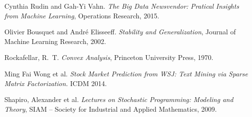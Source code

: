 \begin{thebibliography}{99}

  Cynthia Rudin and Gah-Yi Vahn. \textit{The Big Data Newsvendor: Pratical Insights from
    Machine Learning}, Operations Research, 2015.

  Olivier Bousquet and André Elisseeff. \textit{Stability and Generalization}, Journal of
  Machine Learning Research, 2002.

  Rockafellar, R.~T. \emph{Convex Analysis}, Princeton University Press, 1970.

 Ming Fai Wong et al. \emph{Stock Market Prediction from WSJ: Text Mining via
    Sparse Matrix Factorization.} ICDM 2014. 

Shapiro, Alexander et al. \emph{Lectures on Stochastic Programming:
    Modeling and Theory}, SIAM -- Society for Industrial and Applied Mathematics, 2009.

\end{thebibliography}